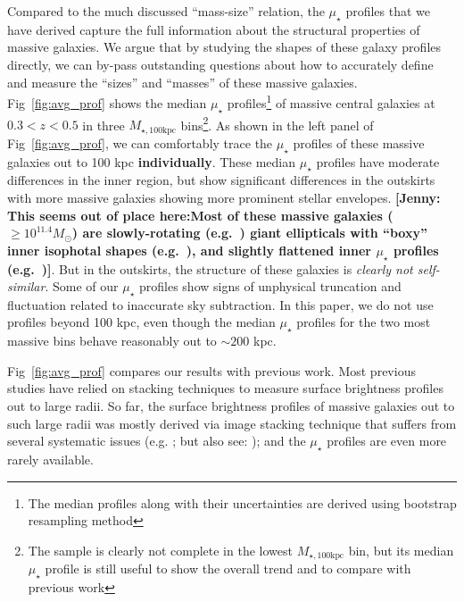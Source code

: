 \documentclass[a4paper,fleqn,usenatbib]{mnras}
\def\mtot{{$M_{\star,100\mathrm{kpc}}$}}
\def\mden{{$\mu_{\star}$}}
\newcommand{\jenny}[1]{\textcolor{Bittersweet}{\textbf{[Jenny: #1]}}}
\begin{document}
    Compared to the much discussed ``mass-size'' relation, the \mden{} profiles that 
    we have derived capture the full information about the structural properties of 
    massive galaxies. 
    We argue that by studying the shapes of these galaxy profiles directly, we can 
    by-pass outstanding questions about how to accurately define and measure the 
    ``sizes'' and ``masses'' of these massive galaxies. 
    Fig~\ref{fig:avg_prof} shows the median \mden{} profiles\footnote{The median 
    profiles along with their uncertainties are derived using bootstrap resampling 
    method} of massive central galaxies at $0.3 < z < 0.5$ in three \mtot{} 
    bins\footnote{The sample is clearly not complete in the lowest \mtot{} bin, 
    but its median \mden{} profile is still useful to show the overall trend and to 
    compare with previous work}. 
    As shown in the left panel of Fig~\ref{fig:avg_prof}, we can comfortably trace
    the \mden{} profiles of these massive galaxies out to 100 kpc 
    \textbf{individually}. 
    These median \mden{} profiles have moderate differences in the inner region, 
    but show significant differences in the outskirts with more massive galaxies 
    showing more prominent stellar envelopes. 
    \jenny{This seems out of place here:Most of these massive galaxies ($\ge 10^{11.4} M_{\odot}$) are slowly-rotating 
    (e.g.\ \citealt{Cappellari13b}) giant ellipticals with ``boxy'' inner isophotal 
    shapes (e.g.\ \citealt{Kormendy2009}), and slightly flattened inner \mden{} 
    profiles (e.g.\ \citealt{Lauer07})}. 
    But in the outskirts, the structure of these galaxies is 
    \emph{clearly not self-similar}. 
    Some of our \mden{} profiles show signs of unphysical truncation and fluctuation 
    related to inaccurate sky subtraction. 
    In this paper, we do not use profiles beyond 100 kpc, even though the median 
    \mden{} profiles for the two most massive bins behave reasonably out to 
    ${\sim} 200$ kpc. 
    
    Fig~\ref{fig:avg_prof} compares our results with previous work. 
    Most previous studies have relied on stacking techniques to measure surface 
    brightness profiles out to large radii.
    So far, the surface brightness profiles of massive galaxies out to such large 
    radii was mostly derived via image stacking technique that suffers from several 
    systematic issues (e.g. \citealt{Tal2011, DSouza2015}; but also see:
    \citealt{Capaccioli2015}); and the \mden{} profiles are even more rarely 
    available.
    
\end{document}
